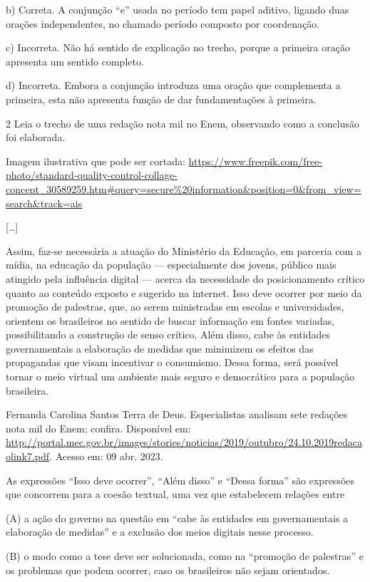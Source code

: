 \begin{itemize}
\begin{itemize}
b) Correta. A conjunção ``e'' usada no período tem papel aditivo,
ligando duas orações independentes, no chamado período composto por
coordenação.

c) Incorreta. Não há sentido de explicação no trecho, porque a primeira
oração apresenta um sentido completo.

d) Incorreta. Embora a conjunção introduza uma oração que complementa a
primeira, esta não apresenta função de dar fundamentações à primeira.

\num{2} Leia o trecho de uma redação nota mil no Enem, observando como a
conclusão foi elaborada.

Imagem ilustrativa que pode ser cortada:
\url{https://www.freepik.com/free-photo/standard-quality-control-collage-concept_30589259.htm\#query=secure\%20information\&position=0\&from_view=search\&track=ais}

{[}\ldots{}{]}

Assim, faz-se necessária a atuação do Ministério da Educação, em
parceria com a mídia, na educação da população --- especialmente dos
jovens, público mais atingido pela influência digital --- acerca da
necessidade do posicionamento crítico quanto ao conteúdo exposto e
sugerido na internet. Isso deve ocorrer por meio da promoção de
palestras, que, ao serem ministradas em escolas e universidades,
orientem os brasileiros no sentido de buscar informação em fontes
variadas, possibilitando a construção de senso crítico. Além disso, cabe
às entidades governamentais a elaboração de medidas que minimizem os
efeitos das propagandas que visam incentivar o consumismo. Dessa forma,
será possível tornar o meio virtual um ambiente mais seguro e
democrático para a população brasileira.

Fernanda Carolina Santos Terra de Deus. Especialistas analisam sete
redações nota mil do Enem; confira. Disponível em:
\url{http://portal.mec.gov.br/images/stories/noticias/2019/outubro/24.10.2019redacaolink7.pdf}.
Acesso em: 09 abr. 2023.

As expressões ``Isso deve ocorrer'', ``Além disso'' e ``Dessa forma''
são expressões que concorrem para a coesão textual, uma vez que
estabelecem relações entre

(A) a ação do governo na questão em ``cabe às entidades em
governamentais a elaboração de medidas'' e a exclusão dos meios digitais
nesse processo.

(B) o modo como a tese deve ser solucionada, como na ``promoção de
palestras'' e os problemas que podem ocorrer, caso os brasileiros não
sejam orientados.


\end{itemize}
\end{itemize}
